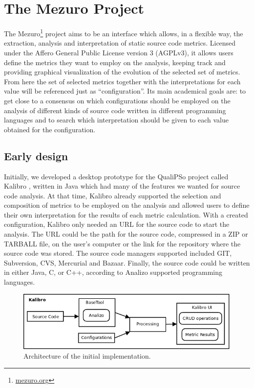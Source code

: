 \newpage
\section{The Mezuro Project}
\label{sec:mezuro}

The Mezuro\footnote{\url{mezuro.org}} project aims to be an interface
which allows, in a flexible way, the extraction, analysis and interpretation of
static source code metrics. Licensed under the Affero General Public License
version 3 (AGPLv3), it allows users define the metrics they want to employ on
the analysis, keeping track and providing graphical visualization of the
evolution of the selected set of metrics. From here the set of selected metrics
together with the interpretations for each value  will be referenced just as
``configuration''. Its main academical goals are: to get close to a consensus
on which configurations should be employed on the analysis of different kinds
of source code written in different programming languages and to search which
interpretation should be given to each value obtained for the configuration.

\subsection{Early design}
\label{subsec:early-design}

Initially, we developed a desktop prototype for the QualiPSo project called
Kalibro \cite{de2013kalibro}, written in Java which had many of the features we
wanted for source code analysis. At that time, Kalibro already supported the
selection and composition of metrics to be employed on the analysis and allowed
users to define their own interpretation for the results of each metric
calculation.  With a created configuration, Kalibro only needed an URL for the
source code to start the analysis. The URL could be the path for the source
code, compressed in a ZIP or TARBALL file, on the user's computer or the link
for the repository where the source code was stored. The source code managers
supported included GIT, Subversion, CVS, Mercurial and Bazaar. Finally, the
source code could be written in either Java, C, or C++, according to Analizo
supported programming languages.

\begin{figure}[htb]
  \centering
  \includegraphics[width=\textwidth]{images/kalibro-initial-arch.png}
  \caption{Architecture of the initial implementation.}
  \label{fig:kalibro-initial-arch}
\end{figure}

